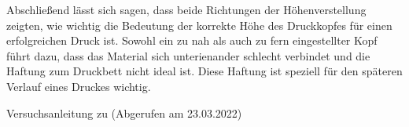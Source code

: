 \documentclass[a4paper,12pt,bibtotocnumbered]{scrartcl}
\numberwithin{equation}{section} %
\begin{document}
Abschließend lässt sich sagen, dass beide Richtungen der Höhenverstellung zeigten, wie wichtig die Bedeutung der korrekte Höhe des Druckkopfes für einen erfolgreichen Druck ist. Sowohl ein zu nah als auch zu fern eingestellter Kopf führt dazu, dass das Material sich unterienander schlecht verbindet und die Haftung zum Druckbett nicht ideal ist. Diese Haftung ist speziell für den späteren Verlauf eines Druckes wichtig.

\newpage
\begin{thebibliography}{999}
 Versuchsanleitung zu (Abgerufen am 23.03.2022) 
\end{thebibliography}


%
\end{document}
